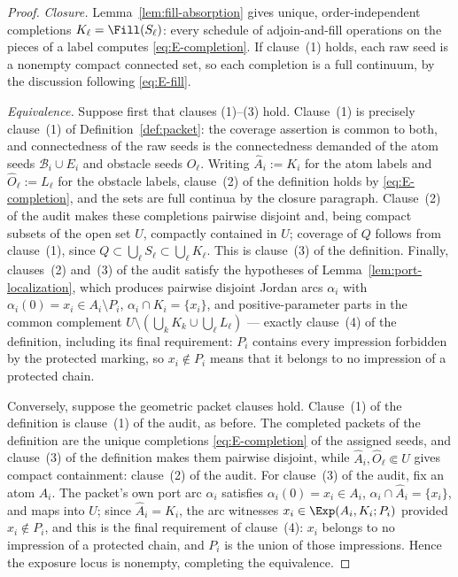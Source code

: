 \begin{proof}
\emph{Closure.}
Lemma~\ref{lem:fill-absorption} gives unique, order-independent completions
$K_\ell=\Fill(S_\ell)$: every schedule of adjoin-and-fill operations on the pieces of
a label computes \eqref{eq:E-completion}. If clause~(1) holds, each raw seed is a
nonempty compact connected set, so each completion is a full continuum, by the discussion
following \eqref{eq:E-fill}.

\emph{Equivalence.}
Suppose first that clauses (1)--(3) hold. Clause~(1) is precisely clause~(1) of
Definition~\ref{def:packet}: the coverage assertion is common to both, and
connectedness of the raw seeds is the connectedness demanded of the atom seeds
$\mathcal B_i\cup E_i$ and obstacle seeds $O_\ell$. Writing $\widehat A_i:=K_i$ for the atom
labels and $\widehat O_\ell:=L_\ell$ for the obstacle labels, clause~(2) of the
definition holds by \eqref{eq:E-completion}, and the sets are full continua by the
closure paragraph. Clause~(2) of the audit makes these completions pairwise disjoint
and, being compact subsets of the open set $U$, compactly contained in $U$; coverage
of $Q$ follows from clause~(1), since $Q\subset\bigcup_\ell S_\ell\subset
\bigcup_\ell K_\ell$. This is clause~(3) of the definition. Finally, clauses~(2)
and~(3) of the audit satisfy the hypotheses of
Lemma~\ref{lem:port-localization}, which produces pairwise disjoint Jordan arcs
$\alpha_i$ with $\alpha_i(0)=x_i\in A_i\setminus P_i$,
$\alpha_i\cap K_i=\{x_i\}$, and positive-parameter parts in the common complement
$U\setminus(\bigcup_kK_k\cup\bigcup_\ell L_\ell)$ --- exactly clause~(4) of the
definition, including its final requirement: $P_i$ contains every impression
forbidden by the protected marking, so $x_i\notin P_i$ means that it belongs to no
impression of a protected chain.

Conversely, suppose the geometric packet clauses hold. Clause~(1) of the definition
is clause~(1) of the audit, as before. The completed packets of the definition are
the unique completions \eqref{eq:E-completion} of the assigned seeds, and clause~(3)
of the definition makes them pairwise disjoint, while
$\widehat A_i,\widehat O_\ell\Subset U$ gives compact containment: clause~(2) of the
audit. For clause~(3) of the audit, fix an atom $A_i$. The packet's own port arc
$\alpha_i$ satisfies $\alpha_i(0)=x_i\in A_i$, $\alpha_i\cap\widehat A_i=\{x_i\}$,
and maps into $U$; since $\widehat A_i=K_i$, the arc witnesses
$x_i\in\Exp(A_i,K_i;P_i)$ provided $x_i\notin P_i$, and this is the final requirement
of clause~(4): $x_i$ belongs to no impression of a protected chain, and $P_i$ is the
union of those impressions. Hence the exposure locus is nonempty, completing the
equivalence.


\end{proof}
